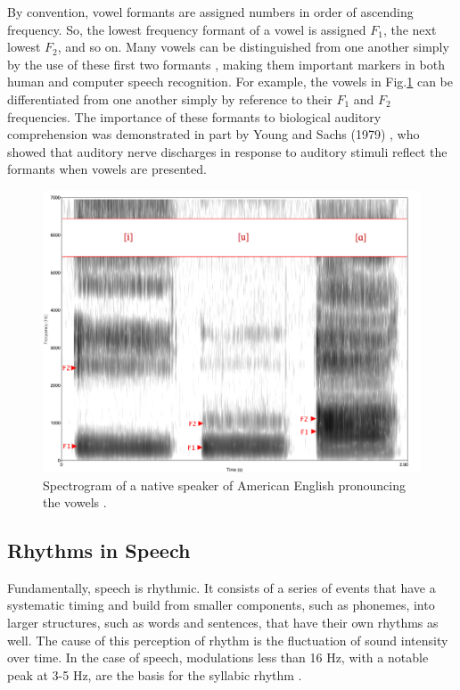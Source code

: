 \documentclass[titlepage]{article}
\begin{document}
    By convention, vowel formants are assigned numbers in order of ascending frequency. So, the
    lowest frequency formant of a vowel is assigned $F_1$, the next lowest $F_2$, and so on.
    Many vowels can be distinguished from one another simply by the use of these first
    two formants \cite{Schnupp2011}, making them important markers in both human and computer
    speech recognition. For example, the vowels in Fig.\ref{formants} can be differentiated
    from one another simply by reference to their $F_1$ and $F_2$ frequencies. The importance
    of these formants to biological auditory comprehension was demonstrated in part by
    Young and Sachs (1979) \cite{Young1979}, who showed that auditory nerve discharges in
    response to auditory stimuli reflect the formants when vowels are presented.


    \begin{figure}
      \centering
      \includegraphics[scale=1.6]{formants}
      \caption{Spectrogram of a native speaker of American English
      pronouncing the vowels \textipa{[i, u, A]} \cite{pict}.}
      \label{formants}
    \end{figure}

  \subsection{Rhythms in Speech} \label{rhythmsInSpeech}

    Fundamentally, speech is rhythmic. It consists of a series of events that have a
    systematic timing and build from smaller components, such as phonemes, into larger
    structures, such as words and sentences, that have their own rhythms as well. The
    cause of this perception of rhythm is the fluctuation of sound intensity over time.
    In the case of speech, modulations less than 16 Hz, with a notable peak at 3-5 Hz,
    are the basis for the syllabic rhythm \cite{Giraud2012,Greenberg2003}.
\end{document}
